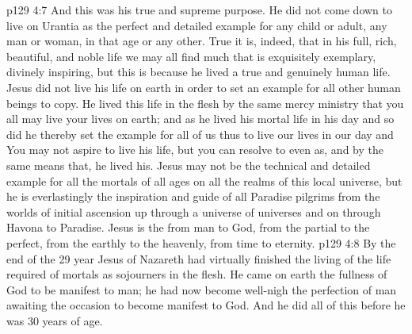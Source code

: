 \vs p129 4:7 And this was his true and supreme purpose. He did not come down to live on Urantia as the perfect and detailed example for any child or adult, any man or woman, in that age or any other. True it is, indeed, that in his full, rich, beautiful, and noble life we may all find much that is exquisitely exemplary, divinely inspiring, but this is because he lived a true and genuinely human life. Jesus did not live his life on earth in order to set an example for all other human beings to copy. He lived this life in the flesh by the same mercy ministry that you all may live your lives on earth; and as he lived his mortal life in his day and  so did he thereby set the example for all of us thus to live our lives in our day and  You may not aspire to live his life, but you can resolve to  even as, and by the same means that, he lived his. Jesus may not be the technical and detailed example for all the mortals of all ages on all the realms of this local universe, but he is everlastingly the inspiration and guide of all Paradise pilgrims from the worlds of initial ascension up through a universe of universes and on through Havona to Paradise. Jesus is the  from man to God, from the partial to the perfect, from the earthly to the heavenly, from time to eternity.
\vs p129 4:8 \pc By the end of the 29 year Jesus of Nazareth had virtually finished the living of the life required of mortals as sojourners in the flesh. He came on earth the fullness of God to be manifest to man; he had now become well\hyp{}nigh the perfection of man awaiting the occasion to become manifest to God. And he did all of this before he was 30 years of age.
\quizlink
